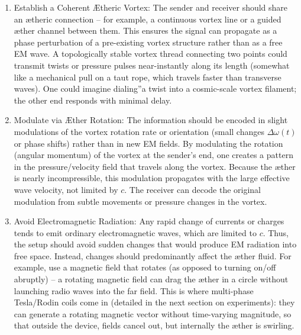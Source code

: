 \begin{enumerate}

\item 
Establish a Coherent Ætheric Vortex: The sender and receiver should share an ætheric connection – for example, a continuous vortex line or a guided æther channel between them. This ensures the signal can propagate as a phase perturbation of a pre-existing vortex structure rather than as a free EM wave. A topologically stable vortex thread connecting two points could transmit twists or pressure pulses near-instantly along its length (somewhat like a mechanical pull on a taut rope, which travels faster than transverse waves). One could imagine \grqq dialing\textquotedblright a twist into a cosmic-scale vortex filament; the other end responds with minimal delay.




\item 
Modulate via Æther Rotation: The information should be encoded in slight modulations of the vortex rotation rate or orientation (small changes $\Delta \omega(t)$ or phase shifts) rather than in new EM fields. By modulating the rotation (angular momentum) of the vortex at the sender's end, one creates a pattern in the pressure/velocity field that travels along the vortex. Because the æther is nearly incompressible, this modulation propagates with the large effective wave velocity, not limited by $c$. The receiver can decode the original modulation from subtle movements or pressure changes in the vortex.




\item 
Avoid Electromagnetic Radiation: Any rapid change of currents or charges tends to emit ordinary electromagnetic waves, which are limited to $c$. Thus, the setup should avoid sudden changes that would produce EM radiation into free space. Instead, changes should predominantly affect the æther fluid. For example, use a magnetic field that rotates (as opposed to turning on/off abruptly) – a rotating magnetic field can drag the æther in a circle without launching radio waves into the far field. This is where multi-phase Tesla/Rodin coils come in (detailed in the next section on experiments): they can generate a rotating magnetic vector without time-varying magnitude, so that outside the device, fields cancel out, but internally the æther is swirling.





\end{enumerate}
